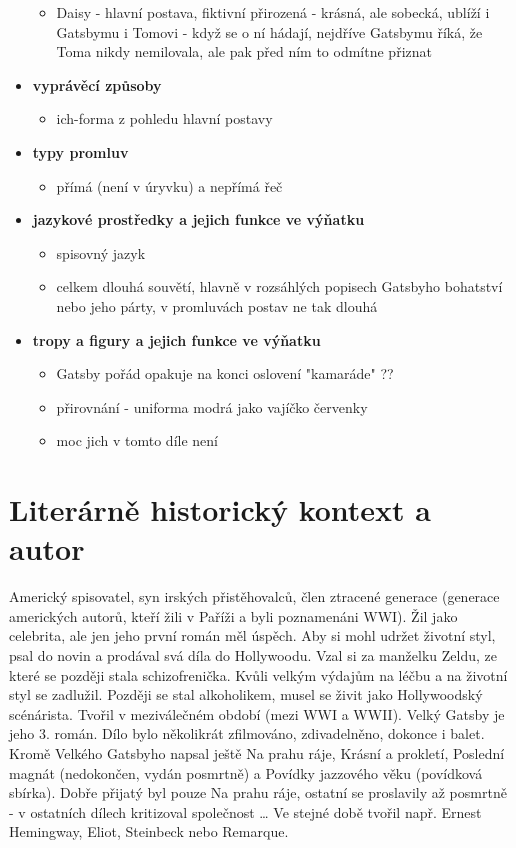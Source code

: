 \documentclass[11pt]{article}
\begin{document}
\begin{itemize}
\begin{itemize}
            \item Daisy - hlavní postava, fiktivní přirozená - krásná, ale sobecká, ublíží i Gatsbymu i Tomovi - když se o ní hádají, nejdříve Gatsbymu říká, že Toma nikdy nemilovala, ale pak před ním to odmítne přiznat
        \end{itemize}
        \item\textbf{vyprávěcí způsoby}
        \begin{itemize}
            \item ich-forma z pohledu hlavní postavy
        \end{itemize}
        \item\textbf{typy promluv}
        \begin{itemize}
            \item přímá (není v úryvku) a nepřímá řeč
        \end{itemize}
        \item\textbf{jazykové prostředky a jejich funkce ve výňatku}
        \begin{itemize}
            \item spisovný jazyk
            \item celkem dlouhá souvětí, hlavně v rozsáhlých popisech Gatsbyho bohatství nebo jeho párty, v promluvách postav ne tak dlouhá
        \end{itemize}
        \item\textbf{tropy a figury a jejich funkce ve výňatku}
        \begin{itemize}
            \item Gatsby pořád opakuje na konci oslovení "kamaráde" ??
            \item přirovnání - uniforma modrá jako vajíčko červenky
            \item moc jich v tomto díle není
        \end{itemize}
    \end{itemize}
    \section*{Literárně historický kontext a autor}
    Americký spisovatel, syn irských přistěhovalců, člen ztracené generace (generace amerických autorů, kteří žili v Paříži a byli poznamenáni WWI).
    Žil jako celebrita, ale jen jeho první román měl úspěch. Aby si mohl udržet životní styl, psal do novin a prodával svá díla do Hollywoodu.
    Vzal si za manželku Zeldu, ze které se později stala schizofrenička. Kvůli velkým výdajům na léčbu a na životní styl se zadlužil.
    Později se stal alkoholikem, musel se živit jako Hollywoodský scénárista.
    Tvořil v meziválečném období (mezi WWI a WWII).
    Velký Gatsby je jeho 3. román.
    Dílo bylo několikrát zfilmováno, zdivadelněno, dokonce i balet.
    Kromě Velkého Gatsbyho napsal ještě Na prahu ráje, Krásní a prokletí, Poslední magnát (nedokončen, vydán posmrtně) a Povídky jazzového věku (povídková sbírka).
    Dobře přijatý byl pouze Na prahu ráje, ostatní se proslavily až posmrtně - v ostatních dílech kritizoval společnost \dots
    Ve stejné době tvořil např. Ernest Hemingway, Eliot, Steinbeck nebo Remarque.
\end{document}
